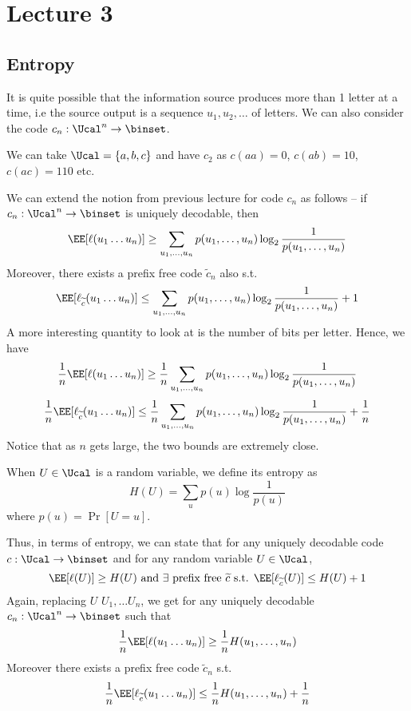 \chapter{Lecture 3}
\section{Entropy}
It is quite possible that the information source produces more than 1 letter at a time, i.e the source output is a sequence $u_1,u_2, \dots$ of letters. We can also consider the code $c_n: \Ucal^n \to \binset$.
\begin{eg}
We can take $\Ucal = \{a,b,c\}$ and have $c_2$ as $c(aa) = 0$, $c(ab)=10$, $c(ac) = 110$ etc.
\end{eg}
We can extend the notion from previous lecture for code $c_n$ as follows -- if $c_n: \Ucal^n \to \binset$ is uniquely decodable, then 
\[\EE[\ell(u_1 \dots u_n)] \geq \sum_{u_1, \dots, u_n} p(u_1, \dots, u_n) \log_2 \frac{1}{p(u_1, \dots, u_n)}\]
Moreover, there exists a prefix free code $\widetilde{c}_n$ also s.t.
\[\EE[\ell_{\widetilde{c}}(u_1 \dots u_n)] \leq \sum_{u_1, \dots, u_n} p(u_1, \dots, u_n) \log_2 \frac{1}{p(u_1, \dots, u_n)} + 1\]
A more interesting quantity to look at is the number of bits per letter. Hence, we have 
\[\frac1n\EE[\ell(u_1 \dots u_n)] \geq \frac{1}{n}\sum_{u_1, \dots, u_n} p(u_1, \dots, u_n) \log_2 \frac{1}{p(u_1, \dots, u_n)}\]
\[\frac1n\EE[\ell_{\widetilde{c}}(u_1 \dots u_n)] \leq \frac{1}{n}\sum_{u_1, \dots, u_n} p(u_1, \dots, u_n) \log_2 \frac{1}{p(u_1, \dots, u_n)} + \frac{1}{n}\]
Notice that as $n$ gets large, the two bounds are extremely close.
\begin{definition}
When $U \in \Ucal$ is a random variable, we define its entropy as 
\[
H(U) = \sum_u p(u) \log\frac{1}{p(u)}
\]
where $p(u) = \Pr[U=u]$.
\end{definition}
Thus, in terms of entropy, we can state that for any uniquely decodable code $c:\Ucal \to \binset$ and for any random variable $U \in \Ucal$,
\[\EE[\ell(U)] \geq H(U)\text{ and $\exists$ prefix free }\widetilde{c} \text{ s.t. } \EE[\ell_{\widetilde c}(U)] \leq H(U) + 1\]
Again, replacing $U$ $U_1, \dots U_n$, we get for any uniquely decodable $c_n: \Ucal^n \to \binset$ such that
\[\frac1n\EE[\ell(u_1 \dots u_n)] \geq \frac{1}{n}H(u_1, \dots, u_n)\]
Moreover there exists a prefix free code $\widetilde{c}_n$ s.t.
\[\frac1n\EE[\ell_{\widetilde{c}}(u_1 \dots u_n)] \leq \frac{1}{n}H(u_1, \dots, u_n) + \frac{1}{n}\]
